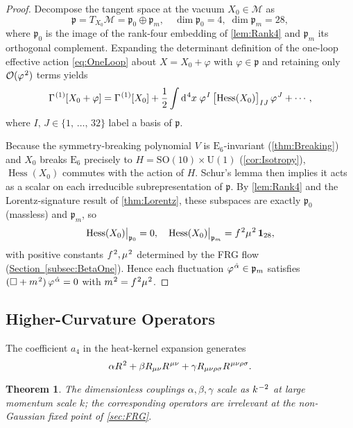 \documentclass[pdflatex,sn-mathphys-num]{sn-jnl}
\theoremstyle{thmstyleone}
\newtheorem{theorem}{Theorem}
\theoremstyle{thmstyletwo}%
\theoremstyle{thmstylethree}%
\newcommand{\SO}[1]{\mathrm{SO(#1)}}
\newcommand{\U}[1]{\mathrm{U(#1)}}
\newcommand{\E}[1]{\mathrm{E_{#1}}}
\newcommand{\SOTen}{\SO{10}}
\newcommand{\UOne}{\U{1}}
\newcommand{\ESix}{\E{6}}
\newcommand{\SOTenXUOne}{\SOTen \times \UOne}
\newcommand{\sm}{\hspace{.065em}}
\newcommand{\subsecref}[1]{\hyperref[#1]{Section~\ref*{#1}}}
\newcommand{\smexp}[1]{^{\sm #1}}
\newcommand{\Hess}[1]{\operatorname{Hess}}
\newcommand{\dv}[1]{\mathrm{d}\smexp{#1}}
\begin{document}
\begin{proof}
Decompose the tangent space at the vacuum \(X_{0}\in\mathcal M\) as
\[
  \mathfrak p
  =T_{X_{0}}\mathcal M
  =\mathfrak p_{0}\oplus\mathfrak p_{m},
  \quad
  \dim\mathfrak p_{0}=4,\;\dim\mathfrak p_{m}=28,
\]
where \(\mathfrak p_{0}\) is the image of the rank-four embedding of
\autoref{lem:Rank4} and \(\mathfrak p_{m}\) its orthogonal complement.
Expanding the determinant definition of the one-loop effective action
\eqref{eq:OneLoop} about \(X=X_{0}+\varphi\) with \(\varphi\in\mathfrak p\) and
retaining only \(\mathcal O(\varphi\smexp{2})\) terms yields
\[
  \Gamma\smexp{(1)}[X_{0}+\varphi]
  = \Gamma\smexp{(1)}[X_{0}]
    + \frac12\int \dv{4}x\;\varphi\smexp{I}\,
      \bigl[\Hess V(X_{0})\bigr]_{IJ}\,
      \varphi\smexp{J}
    + \cdots,
\]
where \(I,\,J\in\{1,\,\dots,\,32\}\) label a basis of \(\mathfrak p\).

Because the symmetry-breaking polynomial \(V\) is \(\ESix\)-invariant
(\autoref{thm:Breaking}) and \(X_{0}\) breaks \(\ESix\) precisely to
\(H=\SOTenXUOne\) (\autoref{cor:Isotropy}), \(\Hess V(X_{0})\) commutes
with the action of \(H\). Schur's lemma then implies it acts as a scalar
on each irreducible subrepresentation of \(\mathfrak p\).
By \autoref{lem:Rank4} and the Lorentz-signature result of
\autoref{thm:Lorentz}, these subspaces are exactly
\(\mathfrak p_{0}\) (massless) and \(\mathfrak p_{m}\), so
\[
  \Hess V(X_{0})\big|_{\mathfrak p_{0}}=0,
  \quad
  \Hess V(X_{0})\big|_{\mathfrak p_{m}}
  = f\smexp{2}\mu\smexp{2}\,\mathbf1_{28},
\]
with positive constants \(f\smexp{2},\mu\smexp{2}\) determined by the FRG flow
(\subsecref{subsec:BetaOne}).  Hence each fluctuation
\(\varphi\smexp{\hat\alpha}\in\mathfrak p_{m}\) satisfies
\((\Box+m\smexp{2})\,\varphi\smexp{\hat\alpha}=0\) with
\(
  m\smexp{2}=f\smexp{2}\mu\smexp{2}
\).
\end{proof}

\subsection{Higher-Curvature Operators}
\label{subsec:highercurv}

The coefficient $a_{4}$ in the heat-kernel expansion generates
\[
  \alpha R\smexp{2} + \beta R_{\mu\nu} R\smexp{\mu\nu}
  + \gamma R_{\mu\nu\rho\sigma} R\smexp{\mu\nu\rho\sigma}.
\]

\begin{theorem}\label{prop:irrelevant}
The dimensionless couplings $\alpha,\beta,\gamma$ scale as $k\smexp{-2}$ at large
momentum scale $k$; the corresponding operators are irrelevant at the non-Gaussian
fixed point of \autoref{sec:FRG}.
\end{theorem}
\end{document}

